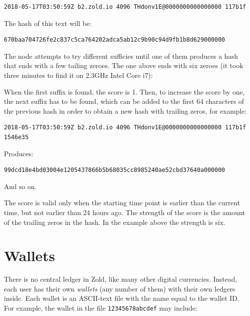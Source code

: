 \documentclass[11pt,oneside]{article}
\newcommand\dd[1]{\colorbox{gray!30}{\texttt{#1}}}
\begin{document}
\begin{verbatim}
2018-05-17T03:50:59Z b2.zold.io 4096 THdonv1E@0000000000000000 117b1f
\end{verbatim}

The hash of this text will be:

\begin{verbatim}
670baa704726fe2c837c5ca764202adca5ab12c9b90c94d9fb1b8d629000000
\end{verbatim}

The node attempts to try different sufficies until one of them produces
a hash that ends with a few tailing zeroes. The one above ends
with six zeroes
(it took three minutes to find it on 2.3GHz Intel Core i7):

When the first suffix is found, the score is 1. Then, to
increase the score by one, the next suffix has to be found, which
can be added to the first 64 characters of the previous hash
in order to obtain a new hash with trailing zeros, for example:

\begin{verbatim}
2018-05-17T03:50:59Z b2.zold.io 4096 THdonv1E@0000000000000000 117b1f 1546e35
\end{verbatim}

Produces:

\begin{verbatim}
99dcd18e4bd03004e1205437866b5b68035cc8985240ae52cbd37640a000000
\end{verbatim}

And so on.

The score is valid only when the starting time point is earlier than
the current time, but not earlier than 24 hours ago. The strength of the score
is the amount of the trailing zeros in the hash. In the example above the
strength is six.

\section{Wallets}

There is no central ledger in Zold, like many other digital currencies.
Instead, each user has their own \emph{wallets} (any number of them) with their own ledgers inside.
Each wallet is an ASCII-text file with the name equal to the wallet ID.
For example, the wallet in the file \dd{12345678abcdef} may include:
\end{document}
